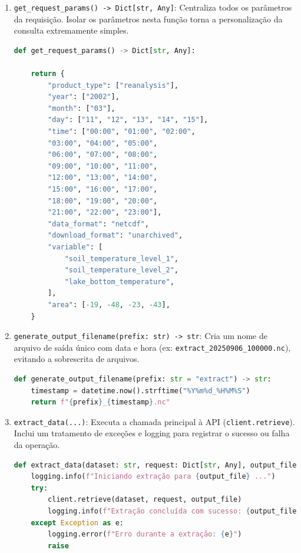 \documentclass[12pt, a4paper]{article}
\begin{document}
\begin{enumerate}
    \item \texttt{get\_request\_params() -> Dict[str, Any]}: Centraliza todos os parâmetros da requisição. Isolar os parâmetros nesta função torna a personalização da consulta extremamente simples.

\begin{lstlisting}[language=Python]
def get_request_params() -> Dict[str, Any]:

    return {
        "product_type": ["reanalysis"],
        "year": ["2002"],
        "month": ["03"],
        "day": ["11", "12", "13", "14", "15"],
        "time": ["00:00", "01:00", "02:00",
        "03:00", "04:00", "05:00",
        "06:00", "07:00", "08:00",
        "09:00", "10:00", "11:00",
        "12:00", "13:00", "14:00",
        "15:00", "16:00", "17:00",
        "18:00", "19:00", "20:00",
        "21:00", "22:00", "23:00"],
        "data_format": "netcdf",
        "download_format": "unarchived",
        "variable": [
            "soil_temperature_level_1",
            "soil_temperature_level_2",
            "lake_bottom_temperature",
        ],
        "area": [-19, -48, -23, -43],
    }
\end{lstlisting}
    
    \item \texttt{generate\_output\_filename(prefix: str) -> str}: Cria um nome de arquivo de saída único com data e hora (ex: \texttt{extract\_20250906\_100000.nc}), evitando a sobrescrita de arquivos.
\begin{lstlisting}[language=Python]
def generate_output_filename(prefix: str = "extract") -> str:
    timestamp = datetime.now().strftime("%Y%m%d_%H%M%S")
    return f"{prefix}_{timestamp}.nc"
\end{lstlisting}
    
    \item \texttt{extract\_data(...)}: Executa a chamada principal à API (\texttt{client.retrieve}). Inclui um tratamento de exceções e logging para registrar o sucesso ou falha da operação.
\begin{lstlisting}[language=Python]
def extract_data(dataset: str, request: Dict[str, Any], output_file: str) -> None:
    logging.info(f"Iniciando extração para {output_file} ...")
    try:
        client.retrieve(dataset, request, output_file)
        logging.info(f"Extração concluída com sucesso: {output_file}")
    except Exception as e:
        logging.error(f"Erro durante a extração: {e}")
        raise
\end{lstlisting}


\end{enumerate}
\end{document}
